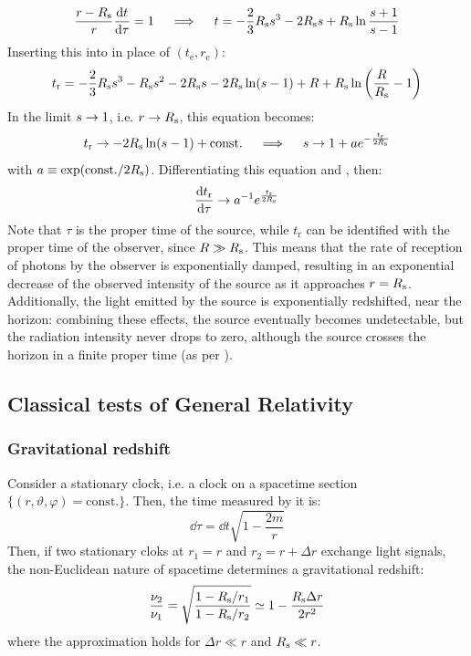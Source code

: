 \begin{equation*}
  \frac{r - R_\text{s}}{r} \frac{\mathrm{d} t}{\mathrm{d} \tau} = 1
  \quad \implies \quad
  t = - \frac{2}{3} R_\text{s} s^3 - 2 R_\text{s} s + R_\text{s} \ln \frac{s + 1}{s - 1}
\end{equation*}
Inserting this into  in place of $ (t_\text{e} , r_\text{e}) $:
\begin{equation*}
  t_\text{r} = - \frac{2}{3} R_\text{s} s^3 - R_\text{s} s^2 - 2 R_\text{s} s - 2 R_\text{s} \ln (s - 1) + R + R_\text{s} \ln \left( \frac{R}{R_\text{s}} - 1 \right)
\end{equation*}
In the limit $ s \rightarrow 1 $, i.e. $ r \rightarrow R_\text{s} $, this equation becomes:
\begin{equation*}
  t_\text{r} \rightarrow - 2 R_\text{s} \ln (s - 1) + \text{const.}
  \quad \implies \quad
  s \rightarrow 1 + a e^{- \frac{t_\text{r}}{2R_\text{s}}}
\end{equation*}
with $ a \equiv \exp (\text{const.} / 2R_\text{s}) $. Differentiating this equation and , then:
\begin{equation}
  \frac{\mathrm{d} t_\text{r}}{\mathrm{d} \tau} \rightarrow a^{-1} e^{\frac{t_\text{r}}{2R_\text{s}}}
\end{equation}
Note that $ \tau $ is the proper time of the source, while $ t_\text{r} $ can be identified with the proper time of the observer, since $ R \gg R_\text{s} $. This means that the rate of reception of photons by the observer is exponentially damped, resulting in an exponential decrease of the observed intensity of the source as it approaches $ r = R_\text{s} $. Additionally, the light emitted by the source is exponentially redshifted\footnotemark, near the horizon: combining these effects, the source eventually becomes undetectable, but the radiation intensity never drops to zero, although the source crosses the horizon in a finite proper time (as per ).


\subsection{Classical tests of General Relativity}

\subsubsection{Gravitational redshift}

Consider a stationary clock, i.e. a clock on a spacetime section $ \{(r,\vartheta,\varphi) = \text{const.}\} $. Then, the time measured by it is:
\begin{equation}
  \dd \tau = \dd t \sqrt{1 - \frac{2m}{r}}
\end{equation}
Then, if two stationary cloks at $ r_1 = r $ and $ r_2 = r + \Delta r $ exchange light signals, the non-Euclidean nature of spacetime determines a gravitational redshift:
\begin{equation}
  \frac{\nu_2}{\nu_1} = \sqrt{\frac{1 - R_\text{s} / r_1}{1 - R_\text{s} / r_2}} \simeq 1 - \frac{R_\text{s} \Delta r}{2 r^2}
\end{equation}
where the approximation holds for $ \Delta r \ll r $ and $ R_\text{s} \ll r $.

